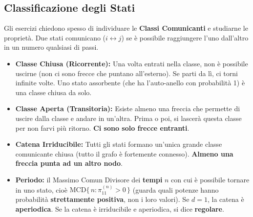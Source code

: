 \documentclass[12pt]{extarticle} %
\begin{document}
\subsection{Classificazione degli Stati}
Gli esercizi chiedono spesso di individuare le \textbf{Classi Comunicanti} e studiarne le proprietà. Due stati comunicano ($i \leftrightarrow j$) se è possibile raggiungere l'uno dall'altro in un numero qualsiasi di passi. 

\begin{itemize}
    \item \textbf{Classe Chiusa (Ricorrente):} Una volta entrati nella classe, non è possibile uscirne (non ci sono frecce che puntano all'esterno). Se parti da lì, ci torni infinite volte. Uno stato assorbente (che ha l'auto-anello con probabilità 1) è una classe chiusa da solo.
    \item \textbf{Classe Aperta (Transitoria):} Esiste almeno una freccia che permette di uscire dalla classe e andare in un'altra. Prima o poi, si lascerà questa classe per non farvi più ritorno. \textbf{Ci sono solo frecce entranti}.
    \item \textbf{Catena Irriducibile:} Tutti gli stati formano un'unica grande classe comunicante chiusa (tutto il grafo è fortemente connesso). \textbf{Almeno una freccia punta ad un altro nodo}.
    \item \textbf{Periodo:} il Massimo Comun Divisore dei \textbf{tempi} $n$ con cui è possibile tornare in uno stato, cioè $\mathrm{MCD}\{\, n : \pi_{11}^{(n)} > 0 \,\}$ (guarda quali potenze hanno probabilità \textbf{strettamente positiva}, non i loro valori). Se $d=1$, la catena è \textbf{aperiodica}. Se la catena è irriducibile e aperiodica, si dice \textbf{regolare}.
\end{itemize}
\end{document}
